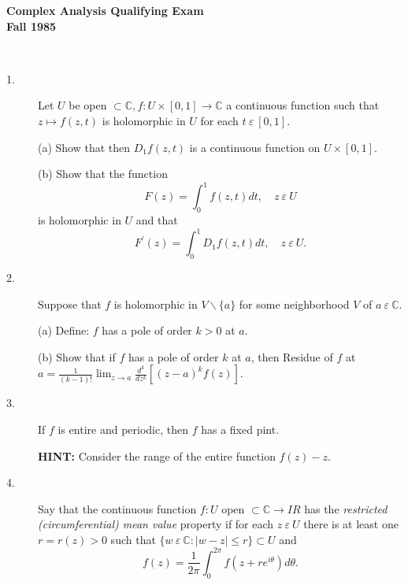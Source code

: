 \documentclass{article}
\def\C{\mathbb C}
\begin{document}






\begin{center}\begin{LARGE}
{\bf Complex Analysis Qualifying Exam}\\ 
{\bf Fall 1985}\\ \end{LARGE}
\end{center}
\vspace{0.1in}
\noindent\hrulefill\\

\begin{description}
\item[1.]
Let $U$ be open $\subset \C, f : U \times [0,1] \to \C$ a continuous
function such that $z \mapsto f(z,t)$ is holomorphic in $U$ for each
$t \  \varepsilon \ [0,1]$.

\item[\quad] (a)
Show that then $D_1 f(z,t)$ is a continuous function on $U \times [0,1]$.

\item[\quad] (b)
Show that the function
$$F(z) = \int^1_0 f (z,t) dt, \quad z \ \varepsilon \  U$$
is holomorphic in $U$ and that
$$F^\prime (z) = \int^1_0 D_1 f(z,t) dt, \quad z \ \varepsilon \ U.$$

\item[2.]
Suppose that $f$ is holomorphic in $V \backslash \{a\}$ for some neighborhood
$V$ of $a \ \varepsilon \ \C$.

\item[\quad] (a)
Define: $f$ has a pole of order $k >0$ at $a$.

\item[\quad] (b)
Show that if $f$ has a pole of order $k$ at $a$, then Residue of
$f$ at
$a =\frac{1}{(k-1)!} \lim_{z \to a} \frac{d^k}{dz^k} \left[(z-a)^k f(z)
\right]$.

\item[3.]
If $f$ is entire and periodic, then $f$ has a fixed pint.

{\bf HINT:} Consider the range of the entire function $f(z) - z$.

\item[4.]
Say that the continuous function $f : U$ open $\subset \C \to IR$ has the
{\it restricted (circumferential) mean value} property if for each
$z \ \varepsilon \ U$ there is at least one $r=r(z) >0$ such that
$\{w \ \varepsilon \ \C : |w-z| \leq r\} \subset U$ and
$$f(z) = \frac{1}{2 \pi} \int^{2\pi}_0 f(z+ re^{i \theta}) d \theta.$$


\end{description}
\end{document}
